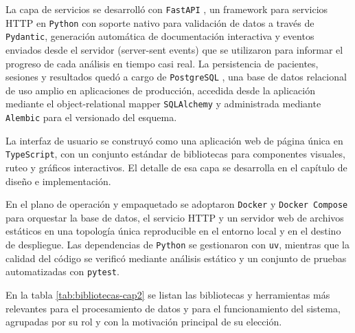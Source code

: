 La capa de servicios se desarrolló con \texttt{FastAPI} \citep{fastapi}, un framework para servicios HTTP en \texttt{Python} con soporte nativo para validación de datos a través de \texttt{Pydantic}, generación automática de documentación interactiva y eventos enviados desde el servidor (server-sent events) que se utilizaron para informar el progreso de cada análisis en tiempo casi real. La persistencia de pacientes, sesiones y resultados quedó a cargo de \texttt{PostgreSQL} \citep{postgresql}, una base de datos relacional de uso amplio en aplicaciones de producción, accedida desde la aplicación mediante el object-relational mapper \texttt{SQLAlchemy} y administrada mediante \texttt{Alembic} para el versionado del esquema.

La interfaz de usuario se construyó como una aplicación web de página única en \texttt{TypeScript}, con un conjunto estándar de bibliotecas para componentes visuales, ruteo y gráficos interactivos. El detalle de esa capa se desarrolla en el capítulo de diseño e implementación.

En el plano de operación y empaquetado se adoptaron \texttt{Docker} \citep{merkel2014docker} y \texttt{Docker Compose} para orquestar la base de datos, el servicio HTTP y un servidor web de archivos estáticos en una topología única reproducible en el entorno local y en el destino de despliegue. Las dependencias de \texttt{Python} se gestionaron con \texttt{uv}, mientras que la calidad del código se verificó mediante análisis estático y un conjunto de pruebas automatizadas con \texttt{pytest}.

En la tabla \ref{tab:bibliotecas-cap2} se listan las bibliotecas y herramientas más relevantes para el procesamiento de datos y para el funcionamiento del sistema, agrupadas por su rol y con la motivación principal de su elección.

